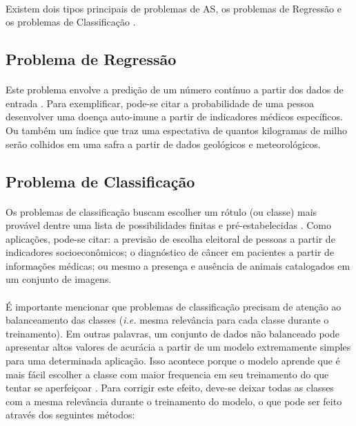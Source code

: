 \paragraph{} Existem dois tipos principais de problemas de AS, os problemas de Regressão e os problemas de Classificação \cite{muller2016introduction}.



\FloatBarrier
\subsection{Problema de Regressão}

\paragraph{} Este problema envolve a predição de um número contínuo a partir dos dados de entrada \cite{muller2016introduction}. Para exemplificar, pode-se citar a probabilidade de uma pessoa desenvolver uma doença auto-imune a partir de indicadores médicos específicos. Ou também um índice que traz uma espectativa de quantos kilogramas de milho serão colhidos em uma safra a partir de dados geológicos e meteorológicos.



\FloatBarrier
\subsection{Problema de Classificação}
\label{sub:class_prob}

\paragraph{} Os problemas de classificação buscam escolher um rótulo (ou classe) mais provável dentre uma lista de possibilidades finitas e pré-estabelecidas \cite{muller2016introduction}. Como aplicações, pode-se citar: a previsão de escolha eleitoral de pessoas a partir de indicadores socioeconômicos; o diagnóstico de câncer em pacientes a partir de informações médicas; ou mesmo a presença e ausência de animais catalogados em um conjunto de imagens.

\paragraph{} É importante mencionar que problemas de classificação precisam de atenção ao balanceamento das classes (\textit{i.e.} mesma relevância para cada classe durante o treinamento). Em outras palavras, um conjunto de dados não balanceado pode apresentar altos valores de acurácia a partir de um modelo extremamente simples para uma determinada aplicação. Isso acontece porque o modelo aprende que é mais fácil escolher a classe com maior frequencia em seu treinamento do que tentar se aperfeiçoar \cite{provost2000machine}. Para corrigir este efeito, deve-se deixar todas as classes com a mesma relevância durante o treinamento do modelo, o que pode ser feito através dos seguintes métodos:

